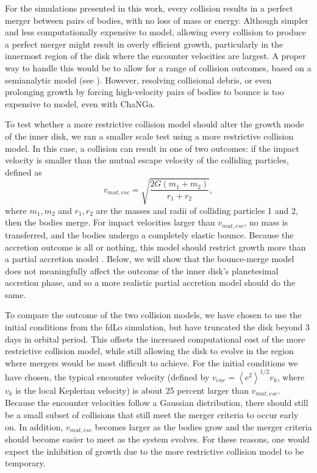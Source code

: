 \documentclass[twocolumn,linenumbers]{aastex63}
\begin{document}
For the simulations presented in this work, every collision results in a perfect merger between pairs of bodies, with no loss
of mass or energy. Although simpler and less computationally expensive to model, allowing every collision to produce a
perfect merger might result in overly efficient growth, particularly in the innermost region of the disk where the encounter 
velocities are largest. A proper way to handle this would be to allow for a range of collision outcomes, based on a semianalytic 
model (see \citet{leinhardt12}). However, resolving collisional debris, or even prolonging growth by forcing high-velocity pairs of 
bodies to bounce is too expensive to model, even with {\sc ChaNGa}.

To test whether a more restrictive collision model should alter the growth mode of the inner disk, we ran a smaller scale test 
using a more restrictive collision model. In this case, a collision can result in one of two outcomes: if the impact velocity is 
smaller than the mutual escape velocity of the colliding particles, defined as
\begin{equation}\label{eq:v_mut}
	v_{mut, esc} = \sqrt{\frac{2 G (m_{1} + m_{2})}{r_{1} + r_{2}}},
\end{equation}
where $m_{1}, m_{2}$ and $r_{1}, r_{2}$ are the masses and radii of
colliding particles 1 and 2, then the bodies merge. For
impact velocities larger than $v_{mut, esc}$, no mass is transferred, and the bodies undergo a completely elastic bounce. 
Because the accretion outcome is all or nothing, this model should restrict growth more than a partial accretion model 
\citep{leinhardt12}. Below, we will show that the bounce-merge model does not meaningfully affect the outcome of the inner 
disk's planetesimal accretion phase, and so a more realistic partial accretion model should do the same.

To compare the outcome of the two collision models, we have chosen to use the initial conditions from the fdLo simulation, but 
have truncated the disk beyond 3 days in orbital period. This offsets the increased computational cost of the more restrictive collision model, while still allowing the disk to evolve in the region where mergers would be most difficult to achieve.
For the initial conditions we have chosen, the typical encounter velocity (defined by $v_{enc} = \left< e^{2} \right>^{1/2} v_{k}$, 
where $v_{k}$ is the local Keplerian velocity) is about 25 percent larger than $v_{mut, esc}$. Because the encounter velocities 
follow a Gaussian distribution, there should still be a small subset of collisions that still meet the merger criteria to occur early on. 
In addition, $v_{mut, esc}$ becomes larger as the bodies grow and the merger criteria should become easier to meet as the 
system evolves. For these reasons, one would expect the inhibition of growth due to the more restrictive collision model to be 
temporary.
\end{document}
